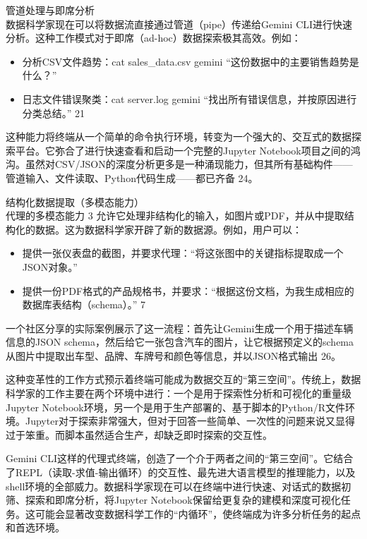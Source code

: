 \documentclass[a4paper,12pt]{article}
\providecommand{\tightlist}{%
  \setlength{\itemsep}{0pt}\setlength{\parskip}{0pt}}
\begin{document}
\begin{multicols}{2}
    管道处理与即席分析\\
    数据科学家现在可以将数据流直接通过管道（pipe）传递给Gemini
    CLI进行快速分析。这种工作模式对于即席（ad-hoc）数据探索极其高效。例如：

    \begin{itemize}
    \tightlist
    \item
      分析CSV文件趋势：cat sales\_data.csv \textbar{} gemini
      ``这份数据中的主要销售趋势是什么？''\\
    \item
      日志文件错误聚类：cat server.log \textbar{} gemini
      ``找出所有错误信息，并按原因进行分类总结。'' 21
    \end{itemize}

    这种能力将终端从一个简单的命令执行环境，转变为一个强大的、交互式的数据探索平台。它弥合了进行快速查看和启动一个完整的Jupyter
    Notebook项目之间的鸿沟。虽然对CSV/JSON的深度分析更多是一种涌现能力，但其所有基础构件------管道输入、文件读取、Python代码生成------都已齐备
    24。

    结构化数据提取（多模态能力）\\
    代理的多模态能力 3
    允许它处理非结构化的输入，如图片或PDF，并从中提取结构化的数据。这为数据科学家开辟了新的数据源。例如，用户可以：

    \begin{itemize}
    \tightlist
    \item
      提供一张仪表盘的截图，并要求代理：``将这张图中的关键指标提取成一个JSON对象。''\\
    \item
      提供一份PDF格式的产品规格书，并要求：``根据这份文档，为我生成相应的数据库表结构（schema）。''
      7
    \end{itemize}

    一个社区分享的实际案例展示了这一流程：首先让Gemini生成一个用于描述车辆信息的JSON
    schema，然后给它一张包含汽车的图片，让它根据预定义的schema从图片中提取出车型、品牌、车牌号和颜色等信息，并以JSON格式输出
    26。

    这种变革性的工作方式预示着终端可能成为数据交互的``第三空间''。传统上，数据科学家的工作主要在两个环境中进行：一个是用于探索性分析和可视化的重量级Jupyter
    Notebook环境，另一个是用于生产部署的、基于脚本的Python/R文件环境。Jupyter对于探索非常强大，但对于回答一些简单、一次性的问题来说又显得过于笨重。而脚本虽然适合生产，却缺乏即时探索的交互性。

    Gemini
    CLI这样的代理式终端，创造了一个介于两者之间的``第三空间''。它结合了REPL（读取-求值-输出循环）的交互性、最先进大语言模型的推理能力，以及shell环境的全部威力。数据科学家现在可以在终端中进行快速、对话式的数据初筛、探索和即席分析，将Jupyter
    Notebook保留给更复杂的建模和深度可视化任务。这可能会显著改变数据科学工作的``内循环''，使终端成为许多分析任务的起点和首选环境。


\end{multicols}
\end{document}
